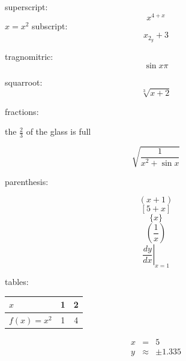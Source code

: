 \documentclass[11pt]{article}
\begin{document}
superscript:
$$x^{4+x}$$
$ x = x^2 $
subscript:
$$ x_2_{y}+3 $$

tragnomitric:
$$ \sin{x\pi} $$

squarroot:
$$ \sqrt[3]{x+2} $$

fractions:

the $\displaystyle{\frac{2}{3}}$ of the glass is full

$$\sqrt{\frac{1}{x^2 +\sin{x}}} $$

parenthesis:

$$ (x+1) $$
$$[5+x] $$
$$ \{x\}$$
$$ \left(\frac{1}{x}\right) $$
$$ \left. \frac{dy}{dx}\right|_{x=1} $$

tables:\\
\begin{tabular}{|l|c|c|}
\hline
$x$ & 1 & 2 \\
\hline
$f(x) = x^2$ & 1 & 4 \\
\hline

\end{tabular}

\begin{eqnarray*}
x &=& 5 \\
y&\approx&\pm1.335
\end{eqnarray*}
\end{document}
